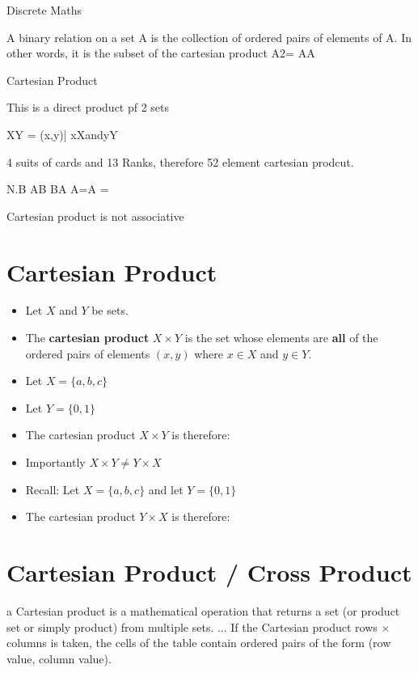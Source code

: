 \documentclass[12pt]{article}
\begin{document}
Discrete Maths

A binary relation on a set A is the collection of ordered pairs of elements of A. In other words, it is the subset of the cartesian product A2= AA

Cartesian Product

This is a direct product pf 2 sets

XY = {(x,y)| xXandyY }

4 suits of cards and 13 Ranks, therefore 52 element cartesian prodcut.

N.B         AB BA
A=A =

Cartesian product is not associative

\section{Cartesian Product}

\begin{itemize}
\item Let $X$ and $Y$ be sets.
\item The \textbf{cartesian product} $X \times Y$ is the set whose elements are \textbf{all} of 
the ordered pairs of elements $(x,y)$ where $x \in X$ and $y \in Y$.
\end{itemize}

\begin{itemize}
\item Let $X = \{a,b,c\}$
\item Let $Y = \{0,1\}$ 
\item The cartesian product $X \times Y$ is therefore:
\end{itemize}

\begin{itemize}
\item Importantly $X \times Y \neq Y \times X$
\item Recall: Let $X = \{a,b,c\}$ and let $Y = \{0,1\}$ 
\item The cartesian product $Y \times X$ is therefore:
\end{itemize}


\section{Cartesian Product / Cross Product}
a Cartesian product is a mathematical operation that returns a set (or product set or simply product) from multiple sets. ... If the Cartesian product rows × columns is taken, the cells of the table contain ordered pairs of the form (row value, column value).
\end{document}
